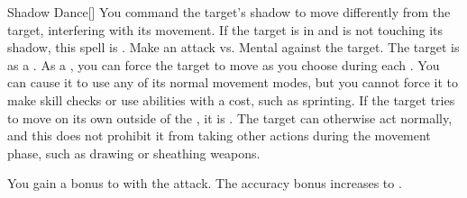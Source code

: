 \lowercase{\hypertarget{spell:Shadow Dance}{}}\label{spell:Shadow Dance}
\begin{freeability}[Rank 3]{\hypertarget{spell:Shadow Dance}{Shadow Dance}}[]
You command the target's shadow to move differently from the target, interfering with its movement.
If the target is in  and is not touching its shadow, this spell is .
Make an attack vs. Mental against the target.
\hit The target is  as a .
\crit As a , you can force the target to move as you choose during each .
You can cause it to use any of its normal movement modes, but you cannot force it to make skill checks or use abilities with a cost, such as sprinting.
If the target tries to move on its own outside of the , it is .
The target can otherwise act normally, and this does not prohibit it from taking other actions during the movement phase, such as drawing or sheathing weapons.

\rankline
{} You gain a  bonus to  with the attack.
 The accuracy bonus increases to .

\end{freeability}
\vspace{0.25em}



